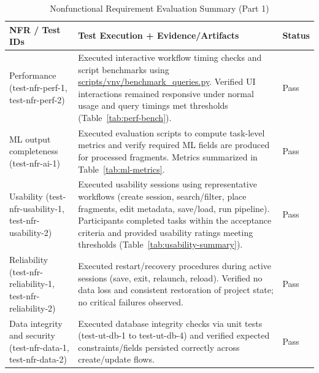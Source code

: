 \documentclass[12pt, titlepage]{article}
\begin{document}
\begin{table}[H]
\centering
\caption{Nonfunctional Requirement Evaluation Summary (Part 1)}
\label{tab:nfr-eval-1}
\begin{tabularx}{\textwidth}{
>{\raggedright\arraybackslash}p{3.2cm}
>{\raggedright\arraybackslash}p{7.1cm}
p{2cm}
}
\toprule
\textbf{NFR / Test IDs} & \textbf{Test Execution + Evidence/Artifacts} & \textbf{Status}\\
\midrule

Performance (test-nfr-perf-1, test-nfr-perf-2) &
Executed interactive workflow timing checks and script benchmarks using \url{scripts/vnv/benchmark_queries.py}. Verified UI interactions remained responsive under normal usage and query timings met thresholds (Table~\ref{tab:perf-bench}). &
Pass\\

ML output completeness (test-nfr-ai-1) &
Executed evaluation scripts to compute task-level metrics and verify required ML fields are produced for processed fragments. Metrics summarized in Table~\ref{tab:ml-metrics}. &
Pass\\

Usability (test-nfr-usability-1, test-nfr-usability-2) &
Executed usability sessions using representative workflows (create session, search/filter, place fragments, edit metadata, save/load, run pipeline). Participants completed tasks within the acceptance criteria and provided usability ratings meeting thresholds (Table~\ref{tab:usability-summary}). &
Pass\\

Reliability (test-nfr-reliability-1, test-nfr-reliability-2) &
Executed restart/recovery procedures during active sessions (save, exit, relaunch, reload). Verified no data loss and consistent restoration of project state; no critical failures observed. &
Pass\\

Data integrity and security (test-nfr-data-1, test-nfr-data-2) &
Executed database integrity checks via unit tests (test-ut-db-1 to test-ut-db-4) and verified expected constraints/fields persisted correctly across create/update flows. &
Pass\\

\bottomrule
\end{tabularx}
\end{table}
\end{document}
